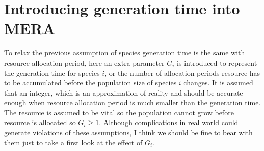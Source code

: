 \documentclass[12pt]{article}
\begin{document}
\section{Introducing generation time into MERA}
To relax the previous assumption of species generation time is the same with resource allocation period, here an extra parameter $G_i$ is introduced to represent the generation time for species $i$, or the number of allocation periods resource has to be accumulated before the population size of species $i$ changes. It is assumed that an integer, which is an approximation of reality and should be accurate enough when resource allocation period is much smaller than the generation time. The resource is assumed to be vital so the population cannot grow before resource is allocated so $G_i \geq 1$. Although complications in real world could generate violations of these assumptions, I think we should be fine to bear with them just to take a first look at the effect of $G_i$.
\end{document}
